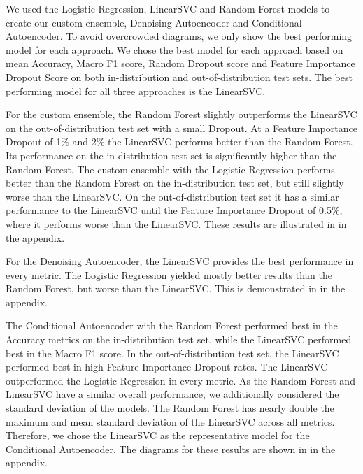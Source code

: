 \documentclass[11pt]{article}
\begin{document}
We used the Logistic Regression, LinearSVC and Random Forest models to create our custom ensemble, Denoising Autoencoder and Conditional Autoencoder. To avoid overcrowded diagrams, we only show the best performing model for each approach. We chose the best model for each approach based on mean Accuracy, Macro F1 score, Random Dropout score and Feature Importance Dropout Score on both in-distribution and out-of-distribution test sets. The best performing model for all three approaches is the LinearSVC.

For the custom ensemble, the Random Forest slightly outperforms the LinearSVC on the out-of-distribution test set with a small Dropout. At a Feature Importance Dropout of 1\% and 2\% the LinearSVC performs better than the Random Forest. Its performance on the in-distribution test set is significantly higher than the Random Forest. The custom ensemble with the Logistic Regression performs better than the Random Forest on the in-distribution test set, but still slightly worse than the LinearSVC. On the out-of-distribution test set it has a similar performance to the LinearSVC until the Feature Importance Dropout of 0.5\%, where it performs worse than the LinearSVC. These results are illustrated in  in the appendix.

For the Denoising Autoencoder, the LinearSVC provides the best performance in every metric. The Logistic Regression yielded mostly better results than the Random Forest, but worse than the LinearSVC. This is demonstrated in  in the appendix.

The Conditional Autoencoder with the Random Forest performed best in the Accuracy metrics on the in-distribution test set, while the LinearSVC performed best in the Macro F1 score. In the out-of-distribution test set, the LinearSVC performed best in high Feature Importance Dropout rates. The LinearSVC outperformed the Logistic Regression in every metric. As the Random Forest and LinearSVC have a similar overall performance, we additionally considered the standard deviation of the models. The Random Forest has nearly double the maximum and mean standard deviation of the LinearSVC across all metrics. Therefore, we chose the LinearSVC as the representative model for the Conditional Autoencoder. The diagrams for these results are shown in  in the appendix.
\end{document}
